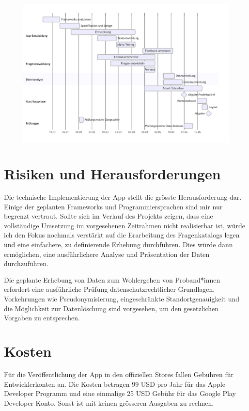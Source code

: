 \documentclass{template}
\begin{document}
\begin{figure}[H]
    \centering
    \includegraphics[width=1\linewidth]{Proposal/Timeline_BA_Lukas_Batschelet-2025-01-20-102140.png}
    \label{fig:timeline}
\end{figure}


\section{Risiken und Herausforderungen}

Die technische Implementierung der App stellt die grösste Herausforderung dar. Einige der geplanten Frameworks und Programmiersprachen sind mir nur begrenzt vertraut. Sollte sich im Verlauf des Projekts zeigen, dass eine vollständige Umsetzung im vorgesehenen Zeitrahmen nicht realisierbar ist, würde ich den Fokus nochmals verstärkt auf die Erarbeitung des Fragenkatalogs legen und eine einfachere, zu definierende Erhebung durchführen. Dies würde dann ermöglichen, eine ausführlichere Analyse und Präsentation der Daten durchzuführen.

Die geplante Erhebung von Daten zum Wohlergehen von Proband*innen erfordert eine ausführliche Prüfung datenschutzrechtlicher Grundlagen. Vorkehrungen wie Pseudonymisierung, eingeschränkte Standortgenauigkeit und die Möglichkeit zur Datenlöschung sind vorgesehen, um den gesetzlichen Vorgaben zu entsprechen.

\section{Kosten}
Für die Veröffentlichung der App in den offiziellen Stores fallen Gebühren für Entwicklerkonten an. Die Kosten betragen 99 USD pro Jahr für das Apple Developer Programm und eine einmalige 25 USD Gebühr für das Google Play Developer-Konto. Sonst ist mit keinen grösseren Ausgaben zu rechnen.
\end{document}
